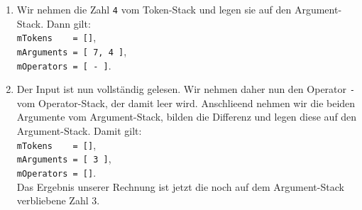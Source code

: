 \begin{enumerate}
\item Wir nehmen die Zahl \texttt{4} vom Token-Stack und legen sie auf den Argument-Stack.
      Dann gilt: \\[0.1cm]
      \hspace*{1.3cm} \texttt{mTokens \ \ \ = []}, \\[0.1cm]
      \hspace*{1.3cm} \texttt{mArguments = [ 7, 4 ]}, \\[0.1cm]
      \hspace*{1.3cm} \texttt{mOperators = [ - ]}. 
\item Der Input ist nun vollst\"andig gelesen.
      Wir nehmen daher nun den Operator \texttt{-} vom Operator-Stack, der damit leer wird.
      Anschlie\3end nehmen wir die beiden Argumente vom Argument-Stack, bilden die
      Differenz und legen diese auf den Argument-Stack.
      Damit gilt: \\[0.1cm]
      \hspace*{1.3cm} \texttt{mTokens \ \ \ = []}, \\[0.1cm]
      \hspace*{1.3cm} \texttt{mArguments = [ 3 ]}, \\[0.1cm]
      \hspace*{1.3cm} \texttt{mOperators = []}. \\[0.1cm]
      Das Ergebnis unserer Rechnung ist jetzt die noch auf dem Argument-Stack verbliebene
      Zahl 3.
\end{enumerate}

